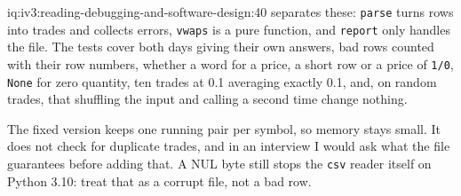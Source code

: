 \begin{solution}{iq:iv3:reading-debugging-and-software-design:40}
 separates these: \texttt{parse} turns rows into trades and collects errors, \texttt{vwaps} is a pure function, and \texttt{report} only handles the file. The tests cover both days giving their own answers, bad rows counted with their row numbers, whether a word for a price, a short row or a price of \texttt{1/0}, \texttt{None} for zero quantity, ten trades at 0.1 averaging exactly 0.1, and, on random trades, that shuffling the input and calling a second time change nothing.

\enlargethispage{-3\baselineskip}%
\label{lst:iv3:rd:reviewfixed}

The fixed version keeps one running pair per symbol, so memory stays small. It does not check for duplicate trades, and in an interview I would ask what the file guarantees before adding that. A NUL byte still stops the \texttt{csv} reader itself on Python 3.10: treat that as a corrupt file, not a bad row.


\end{solution}
